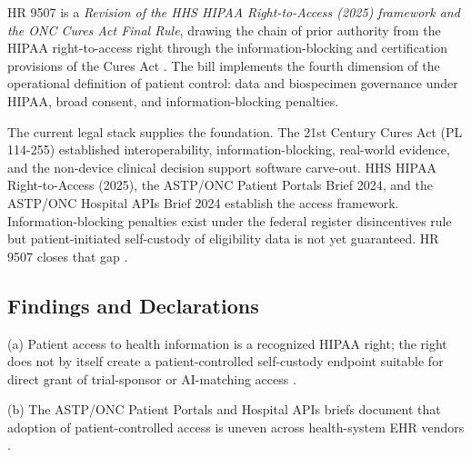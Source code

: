 
\hspace{0.5cm} HR 9507 is a \textit{Revision of the HHS HIPAA Right-to-Access (2025)
framework and the ONC Cures Act Final Rule}, drawing the chain of
prior authority from the HIPAA right-to-access right through the
information-blocking and certification provisions of the Cures Act
\cite{hhs_right_to_access_2025, onc_cures_act_final_rule_page,
federal_register_info_blocking_disincentives_2024}. The bill
implements the fourth dimension of the operational definition of
patient control: data and biospecimen governance under HIPAA, broad
consent, and information-blocking penalties.

The current legal stack supplies the foundation. The 21st Century
Cures Act (PL 114-255) established interoperability, information-blocking, real-world evidence, and the non-device clinical decision
support software carve-out. HHS HIPAA Right-to-Access (2025), the
ASTP/ONC Patient Portals Brief 2024, and the ASTP/ONC Hospital APIs
Brief 2024 establish the access framework. Information-blocking
penalties exist under the federal register disincentives rule but
patient-initiated self-custody of eligibility data is not yet
guaranteed. HR 9507 closes that gap
\cite{rank1_cures_act_2016, onc_cures_act_final_rule_page,
hhs_right_to_access_2025, astp_onc_patient_portals_apps_2024,
astp_onc_hospital_apis_2024,
federal_register_info_blocking_disincentives_2024}.

\subsection{Findings and Declarations}

\hspace{0.5cm} (a) Patient access to health information is a recognized HIPAA
right; the right does not by itself create a patient-controlled
self-custody endpoint suitable for direct grant of trial-sponsor or
AI-matching access \cite{hhs_right_to_access_2025}.

(b) The ASTP/ONC Patient Portals and Hospital APIs briefs document
that adoption of patient-controlled access is uneven across health-system EHR vendors \cite{astp_onc_patient_portals_apps_2024,
astp_onc_hospital_apis_2024}.


